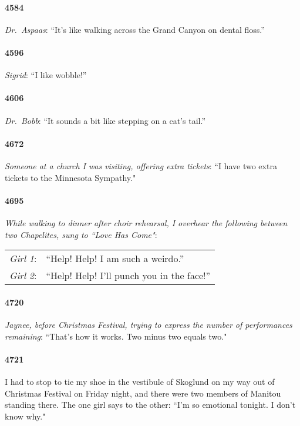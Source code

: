 \documentclass[10pt]{memoir}
\newcommand{\speakertag}[1]{\emph{#1}: }
\newcommand{\st}{\speakertag}
\newcommand{\intro}[1]{\emph{#1}}
\begin{document}
\paragraph{4584} \intro{Dr.\ Aspaas}: ``It's like walking across the Grand Canyon on dental floss.''

\paragraph{4596} \intro{Sigrid}: ``I like wobble!''

\paragraph{4606} \intro{Dr.\ Bobb}: ``It sounds a bit like stepping on a cat's tail.''
\paragraph{4672} \intro{Someone at a church I was visiting, offering extra tickets}: ``I have two extra tickets to the Minnesota Sympathy."

\paragraph{4695} \intro{While walking to dinner after choir rehearsal, I overhear the following between two Chapelites, sung to ``Love Has Come"}:\\

\noindent \begin{tabularx}{\textwidth}{r X}
\st{Girl 1} & ``Help! Help! I am such a weirdo.'' \\
\st{Girl 2} & ``Help! Help! I'll punch you in the face!'' \\
\end{tabularx}

\paragraph{4720} \intro{Jaynee, before Christmas Festival, trying to express the number of performances remaining}: ``That's how it works. Two minus two equals two."

\paragraph{4721} I had to stop to tie my shoe in the vestibule of Skoglund on my way out of Christmas Festival on Friday night, and there were two members of Manitou standing there. The one girl says to the other: ``I'm so emotional tonight. I don't know why."
\end{document}

